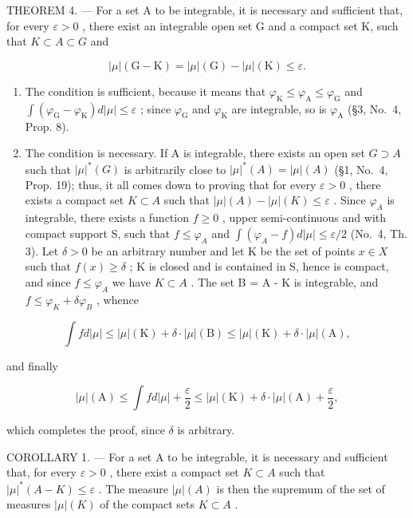 THEOREM 4. --- For a set A to be integrable, it is necessary and sufficient that, for every \(\varepsilon > 0\) , there exist an integrable open set G and a compact set K, such that \(K \subset A \subset G\) and

\[
| \mu | (\mathrm{G} - \mathrm{K}) = | \mu | (\mathrm{G}) - | \mu | (\mathrm{K}) \leqslant \varepsilon .
\]

\begin{enumerate}
\def\labelenumi{\alph{enumi})}
\item
  The condition is sufficient, because it means that \(\varphi_{\mathrm{K}} \leqslant \varphi_{\mathrm{A}} \leqslant \varphi_{\mathrm{G}}\) and \(\int (\varphi_{\mathrm{G}} - \varphi_{\mathrm{K}}) d|\mu| \leqslant \varepsilon\) ; since \(\varphi_{\mathrm{G}}\) and \(\varphi_{\mathrm{K}}\) are integrable, so is \(\varphi_{\mathrm{A}}\) (§3, No.~4, Prop. 8).
\item
  The condition is necessary. If A is integrable, there exists an open set \(G \supset A\) such that \(|\mu|^{*}(G)\) is arbitrarily close to \(|\mu|^{*}(A) = |\mu|(A)\) (§1, No.~4, Prop. 19); thus, it all comes down to proving that for every \(\varepsilon > 0\) , there exists a compact set \(K \subset A\) such that \(|\mu|(A) - |\mu|(K) \leqslant \varepsilon\) . Since \(\varphi_{A}\) is integrable, there exists a function \(f \geqslant 0\) , upper semi-continuous and with compact support S, such that \(f \leqslant \varphi_{A}\) and \(\int(\varphi_{A} - f)d|\mu| \leqslant \varepsilon/2\) (No.~4, Th. 3). Let \(\delta > 0\) be an arbitrary number and let K be the set of points \(x \in X\) such that \(f(x) \geqslant \delta\) ; K is closed and is contained in S, hence is compact, and since \(f \leqslant \varphi_{A}\) we have \(K \subset A\) . The set B = A - K is integrable, and \(f \leqslant \varphi_{K} + \delta\varphi_{B}\) , whence
\end{enumerate}

\[
\int f d | \mu | \leqslant | \mu | (\mathrm{K}) + \delta \cdot | \mu | (\mathrm{B}) \leqslant | \mu | (\mathrm{K}) + \delta \cdot | \mu | (\mathrm{A}),
\]

and finally

\[
| \mu | (\mathrm{A}) \leqslant \int f d | \mu | + \frac {\varepsilon}{2} \leqslant | \mu | (\mathrm{K}) + \delta \cdot | \mu | (\mathrm{A}) + \frac {\varepsilon}{2},
\]

which completes the proof, since \(\delta\) is arbitrary.

COROLLARY 1. --- For a set A to be integrable, it is necessary and sufficient that, for every \(\varepsilon > 0\) , there exist a compact set \(K \subset A\) such that \(|\mu|^*(A - K) \leqslant \varepsilon\) . The measure \(|\mu|(A)\) is then the supremum of the set of measures \(|\mu|(K)\) of the compact sets \(K \subset A\) .

